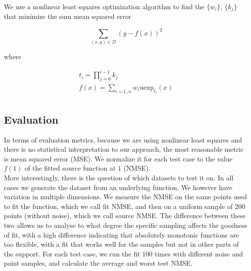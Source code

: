 \documentclass[12pt,a4paper]{article}
\newcommand{\uexp}[1] {{\text{uexp}_{#1}}}
\begin{document}
We use a nonlinear least squares optimization algorithm to find the $\{w_i\}$, $\{k_j\}$ that minimize the sum mean squared error 

\begin{equation}
\sum_{(x,y) \in \mathcal{D}} (y - f(x))^2
\end{equation}

\noindent where

\begin{equation}
\begin{array}{l}
t_i = \prod\limits_{j=0}^{i-1} k_j\\
f(x) = \sum\limits_{i=1..n} w_i \uexp{t_i}(x)\\
\end{array}
\end{equation}

\subsection{Evaluation}

In terms of evaluation metrics, because we are using nonlinear least squares and there is no statistical interpretation to our approach, the most reasonable metric is mean squared error (MSE). We normalize it for each test case to the value $f(1)$ of the fitted source function at $1$ (NMSE).\\

More interestingly, there is the question of which datasets to test it on. In all cases we generate the dataset from an underlying function. We however have variation in multiple dimensions. We measure the NMSE on the same points used to fit the function, which we call fit NMSE, and then on a uniform sample of 200 points (without noise), which we call source NMSE. The difference between these two allows us to analyse to what degree the specific sampling affects the goodness of fit, with a high difference indicating that absolutely monotonic functions are too flexible, with a fit that works well for the samples but not in other parts of the support. For each test case, we run the fit $100$ times with different noise and point samples, and calculate the average and worst test NMSE.
\end{document}
